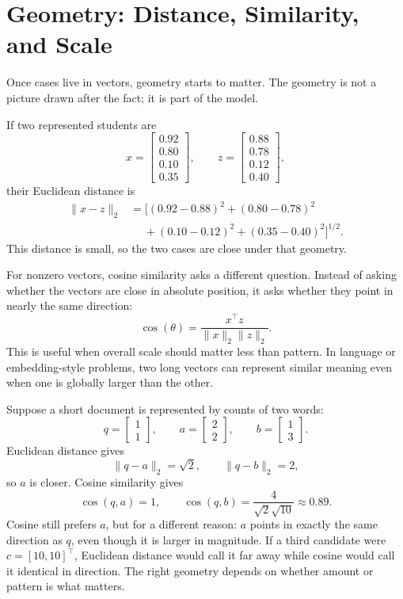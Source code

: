 \section*{Geometry: Distance, Similarity, and Scale}

Once cases live in vectors, geometry starts to matter. The geometry is not a picture drawn after the fact; it is part of the model.

If two represented students are
\[
x =
\begin{bmatrix}
0.92 \\
0.80 \\
0.10 \\
0.35
\end{bmatrix},
\qquad
z =
\begin{bmatrix}
0.88 \\
0.78 \\
0.12 \\
0.40
\end{bmatrix},
\]
their Euclidean distance is
\begin{align*}
\|x-z\|_2 &= \bigl[(0.92{-}0.88)^2 + (0.80{-}0.78)^2 \\
&\quad\;+ (0.10{-}0.12)^2 + (0.35{-}0.40)^2\bigr]^{1/2}.
\end{align*}
This distance is small, so the two cases are close under that geometry.

For nonzero vectors, cosine similarity asks a different question. Instead of asking whether the vectors are close in absolute position, it asks whether they point in nearly the same direction:
\[
\cos(\theta) = \frac{x^\top z}{\|x\|_2 \|z\|_2}.
\]
This is useful when overall scale should matter less than pattern. In language or embedding-style problems, two long vectors can represent similar meaning even when one is globally larger than the other.

\begin{example}
Suppose a short document is represented by counts of two words:
\[
q = \begin{bmatrix}1\\1\end{bmatrix},\qquad
a = \begin{bmatrix}2\\2\end{bmatrix},\qquad
b = \begin{bmatrix}1\\3\end{bmatrix}.
\]
Euclidean distance gives
\[
\|q-a\|_2=\sqrt{2}, \qquad \|q-b\|_2=2,
\]
so \(a\) is closer. Cosine similarity gives
\[
\cos(q,a)=1,\qquad \cos(q,b)=\frac{4}{\sqrt{2}\sqrt{10}}\approx 0.89.
\]
Cosine still prefers \(a\), but for a different reason: \(a\) points in exactly the same direction as \(q\), even though it is larger in magnitude. If a third candidate were \(c=[10,10]^\top\), Euclidean distance would call it far away while cosine would call it identical in direction. The right geometry depends on whether amount or pattern is what matters.
\end{example}

